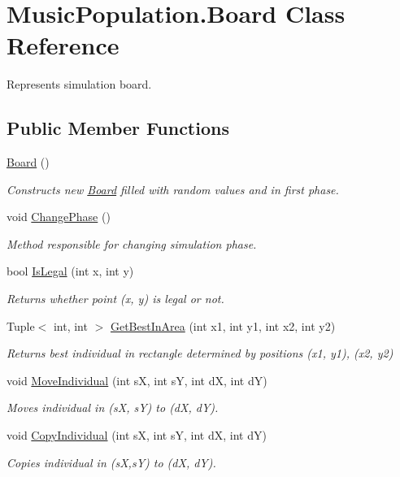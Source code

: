 \hypertarget{class_music_population_1_1_board}{\section{Music\+Population.\+Board Class Reference}
\label{class_music_population_1_1_board}
}


Represents simulation board.  


\subsection*{Public Member Functions}
\begin{DoxyCompactItemize}
\item 
\hyperlink{class_music_population_1_1_board_af3767b8609c26674c30bf536db221db3}{Board} ()
\begin{DoxyCompactList}\small\item\em Constructs new \hyperlink{class_music_population_1_1_board}{Board} filled with random values and in first phase. \end{DoxyCompactList}\item 
void \hyperlink{class_music_population_1_1_board_aa3525b70d6179fc9b9377431e7a09303}{Change\+Phase} ()
\begin{DoxyCompactList}\small\item\em Method responsible for changing simulation phase. \end{DoxyCompactList}\item 
bool \hyperlink{class_music_population_1_1_board_a2d2aed951c7749bab64d447979e11db2}{Is\+Legal} (int x, int y)
\begin{DoxyCompactList}\small\item\em Returns whether point (x, y) is legal or not. \end{DoxyCompactList}\item 
Tuple$<$ int, int $>$ \hyperlink{class_music_population_1_1_board_aace7e7443efbe0e3b1298dd553c7b8e8}{Get\+Best\+In\+Area} (int x1, int y1, int x2, int y2)
\begin{DoxyCompactList}\small\item\em Returns best individual in rectangle determined by positions (x1, y1), (x2, y2) \end{DoxyCompactList}\item 
void \hyperlink{class_music_population_1_1_board_a1e1ececc516d74bbdcf254fd61075253}{Move\+Individual} (int s\+X, int s\+Y, int d\+X, int d\+Y)
\begin{DoxyCompactList}\small\item\em Moves individual in (s\+X, s\+Y) to (d\+X, d\+Y). \end{DoxyCompactList}\item 
void \hyperlink{class_music_population_1_1_board_aad68697f57bb84e480c448e85eb0128e}{Copy\+Individual} (int s\+X, int s\+Y, int d\+X, int d\+Y)
\begin{DoxyCompactList}\small\item\em Copies individual in (s\+X,s\+Y) to (d\+X, d\+Y). \end{DoxyCompactList}\end{DoxyCompactItemize}
